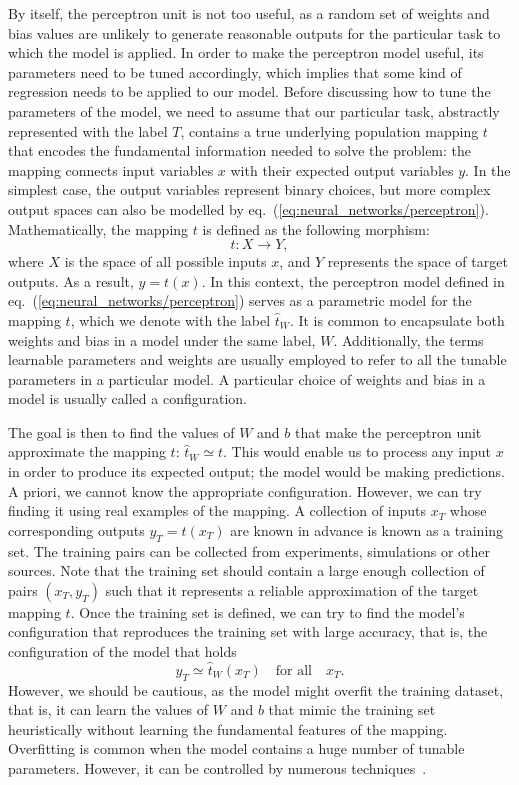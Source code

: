 By itself, the perceptron unit is not too useful, as a random set of weights and bias values are unlikely to
generate reasonable outputs for the particular task to which the model is applied. In order to make the
perceptron model useful, its parameters need to be tuned accordingly, which implies that some kind of
regression needs to be applied to our model. Before discussing how to tune the parameters of the model, we
need to assume that our particular task, abstractly represented with the label $T$, contains a true underlying
population mapping $t$ that encodes the fundamental information needed to solve the problem: the mapping
connects input variables $x$ with their expected output variables $y$. In the simplest case, the output
variables represent binary choices, but more complex output spaces can also be modelled by
eq.~(\ref{eq:neural_networks/perceptron}). Mathematically, the mapping $t$ is defined as the following
morphism:
\begin{equation}
    t: X \to Y,
\end{equation}
where $X$ is the space of all possible inputs $x$, and $Y$ represents the space of target outputs. As a
result, $y = t(x)$. In this context, the perceptron model defined in eq.~(\ref{eq:neural_networks/perceptron})
serves as a parametric model for the mapping $t$, which we denote with the label $\hat{t}_W$. It is common to
encapsulate both weights and bias in a model under the same label, $W$. Additionally, the terms learnable
parameters and weights are usually employed to refer to all the tunable parameters in a particular model. A
particular choice of weights and bias in a model is usually called a configuration.

The goal is then to find the values of $W$ and $b$ that make the perceptron unit approximate the mapping $t$:
$\hat{t}_W \simeq t$. This would enable us to process any input $x$ in order to produce its expected output;
the model would be making predictions. A priori, we cannot know the appropriate configuration. However, we can
try finding it using real examples of the mapping. A collection of inputs $x_T$ whose corresponding outputs
$y_T = t(x_T)$ are known in advance is known as a training set. The training pairs can be collected from
experiments, simulations or other sources. Note that the training set should contain a large enough collection
of pairs $(x_T, y_T)$ such that it represents a reliable approximation of the target mapping $t$. Once the
training set is defined, we can try to find the model's configuration that reproduces the training set with
large accuracy, that is, the configuration of the model that holds
\begin{equation}
    y_T \simeq \hat{t}_W(x_T)\quad \text{for all}\quad x_T.
\end{equation}
However, we should be cautious, as the model might overfit the training dataset, that is, it can learn the
values of $W$ and $b$ that mimic the training set heuristically without learning the fundamental features of
the mapping. Overfitting is common when the model contains a huge number of tunable parameters. However, it
can be controlled by numerous techniques~\cite{ying2019overview}.

